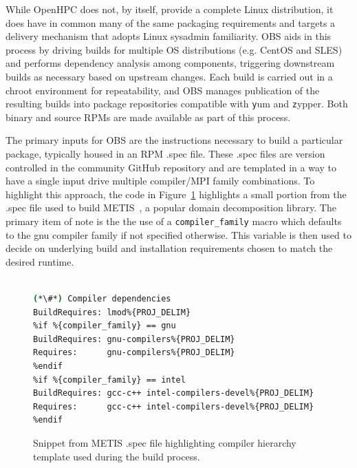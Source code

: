 \documentclass{sig-alternate-05-2015}
\begin{document}
While OpenHPC does not, by itself, provide a complete Linux distribution, it
does have in common many of the same packaging requirements and targets a
delivery mechanism that adopts Linux sysadmin familiarity.  OBS aids in this
process by driving builds for multiple OS distributions (e.g. CentOS and SLES)
and performs dependency analysis among components, triggering downstream
builds as necessary based on upstream changes. Each build is carried out in a
chroot environment for repeatability, and OBS manages publication of the resulting
builds into package repositories compatible with {\texttt yum} and {\texttt
  zypper}. Both binary and source RPMs are made available as part of this process.

The primary inputs for OBS are the instructions necessary to build a particular
package, typically housed in an RPM .spec file. These .spec files are version controlled in the
community GitHub repository and are templated in a way to have a single input
drive multiple compiler/MPI family combinations.  To highlight this approach,
the code in Figure~\ref{fig:metis_spec} highlights a small portion from the .spec file used to build
METIS~\cite{Karypis:1998}, a popular domain decomposition library. The primary
item of note is the the use of a \texttt{compiler\_family} macro which defaults
to the gnu compiler family if not specified otherwise.  This variable is then used
to decide on underlying build and installation requirements chosen to match the
desired runtime.

\begin{figure}[h]
\begin{lstlisting}[language=bash,keywords={},basicstyle=\fontsize{7.8}{10}\ttfamily,keepspaces]
%{!?compiler_family: %define compiler_family gnu}

(*\#*) Compiler dependencies
BuildRequires: lmod%{PROJ_DELIM}
%if %{compiler_family} == gnu
BuildRequires: gnu-compilers%{PROJ_DELIM}
Requires:      gnu-compilers%{PROJ_DELIM}
%endif
%if %{compiler_family} == intel
BuildRequires: gcc-c++ intel-compilers-devel%{PROJ_DELIM}
Requires:      gcc-c++ intel-compilers-devel%{PROJ_DELIM}
%endif
\end{lstlisting}
\vspace*{-0.3cm}
  \caption{Snippet from METIS .spec file highlighting compiler hierarchy
    template used during the build process.}
    \label{fig:metis_spec}
\end{figure}
\end{document}
